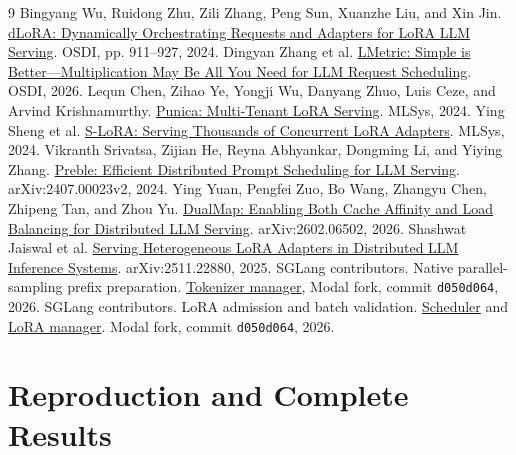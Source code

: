 \documentclass[10pt,twocolumn,letterpaper]{article}
\begin{document}
\begin{thebibliography}{9}
 Bingyang Wu, Ruidong Zhu, Zili Zhang, Peng Sun, Xuanzhe Liu,
and Xin Jin. \href{https://www.usenix.org/system/files/osdi24-wu-bingyang.pdf}{dLoRA:
Dynamically Orchestrating Requests and Adapters for LoRA LLM Serving}.
OSDI, pp. 911--927, 2024.
 Dingyan Zhang et al.
\href{https://www.usenix.org/system/files/osdi26-zhang-dingyan.pdf}{LMetric:
Simple is Better---Multiplication May Be All You Need for LLM Request Scheduling}.
OSDI, 2026.
 Lequn Chen, Zihao Ye, Yongji Wu, Danyang Zhuo, Luis Ceze,
and Arvind Krishnamurthy. \href{https://arxiv.org/abs/2310.18547}{Punica:
Multi-Tenant LoRA Serving}. MLSys, 2024.
 Ying Sheng et al.
\href{https://arxiv.org/abs/2311.03285}{S-LoRA: Serving Thousands of Concurrent
LoRA Adapters}. MLSys, 2024.
 Vikranth Srivatsa, Zijian He, Reyna Abhyankar, Dongming Li,
and Yiying Zhang. \href{https://arxiv.org/abs/2407.00023v2}{Preble: Efficient
Distributed Prompt Scheduling for LLM Serving}. arXiv:2407.00023v2, 2024.
 Ying Yuan, Pengfei Zuo, Bo Wang, Zhangyu Chen, Zhipeng Tan,
and Zhou Yu. \href{https://arxiv.org/abs/2602.06502}{DualMap: Enabling Both Cache
Affinity and Load Balancing for Distributed LLM Serving}. arXiv:2602.06502, 2026.
 Shashwat Jaiswal et al.
\href{https://arxiv.org/abs/2511.22880}{Serving Heterogeneous LoRA Adapters in
Distributed LLM Inference Systems}. arXiv:2511.22880, 2025.
 SGLang contributors. Native parallel-sampling prefix preparation.
\href{https://github.com/modal-projects/sglang/blob/d050d06437d96196fc68d5b4e5c246408790d537/python/sglang/srt/managers/tokenizer_manager.py\#L1701}{Tokenizer manager},
Modal fork, commit \texttt{d050d064}, 2026.
 SGLang contributors. LoRA admission and batch validation.
\href{https://github.com/modal-projects/sglang/blob/d050d06437d96196fc68d5b4e5c246408790d537/python/sglang/srt/managers/scheduler.py\#L3277}{Scheduler}
and \href{https://github.com/modal-projects/sglang/blob/d050d06437d96196fc68d5b4e5c246408790d537/python/sglang/srt/lora/lora_manager.py\#L361}{LoRA manager}.
Modal fork, commit \texttt{d050d064}, 2026.
\end{thebibliography}
\appendix
\section{Reproduction and Complete Results}\label{sec:reproduce}

\end{document}
